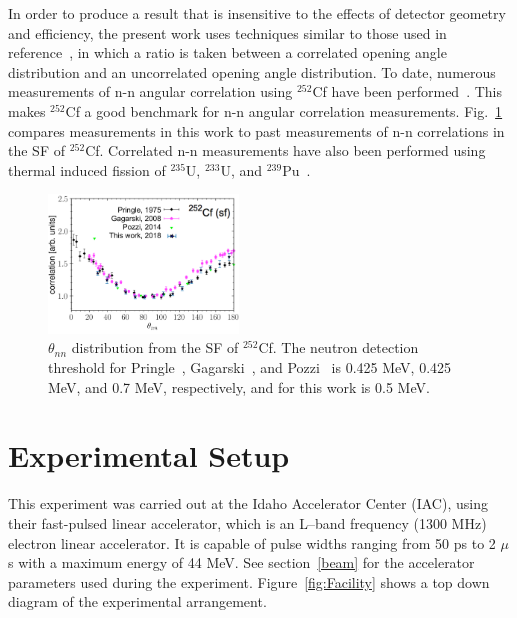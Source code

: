 \documentclass[%
 reprint,
 amsmath,amssymb,
 aps,
 nofootinbib
]{revtex4-1}
\begin{document}
In order to produce a result that is insensitive to the effects of detector geometry and efficiency, the present work uses techniques similar to those used in reference~\cite{1975Cf252}, in which a ratio is taken between a correlated opening angle distribution and an uncorrelated opening angle distribution.
To date, numerous measurements of n-n angular correlation using $^{252}$Cf have been performed~\cite{Verbeke2018, Pozzi2014, 2008CF252, 1975Cf252}.
This makes $^{252}$Cf a good benchmark for n-n angular correlation measurements.
Fig.~\ref{fig:Cf252_us_vs_them} compares measurements in this work to past measurements of n-n correlations in the SF of $^{252}$Cf.
Correlated n-n measurements have also been performed using thermal induced fission of $^{235}$U, $^{233}$U, and $^{239}$Pu~\cite{Sokolov2010}.
\begin{figure}[h]
\centering
\includegraphics[width=0.45\textwidth]{Cf252_us_vs_them.png}
\caption{$\theta_{nn}$ distribution from the SF of $^{252}$Cf.
 The neutron detection threshold for Pringle~\cite{1975Cf252}, Gagarski~\cite{2008CF252}, and Pozzi~\cite{Pozzi2016} is 0.425 MeV, 0.425 MeV, and 0.7 MeV, respectively, and for this work is 0.5 MeV.
}
\label{fig:Cf252_us_vs_them}
\end{figure}

\section{Experimental Setup}
This experiment was carried out at the Idaho Accelerator Center (IAC), using their fast-pulsed linear accelerator, which is an L--band frequency (1300 MHz) electron linear accelerator.
It is capable of pulse widths ranging from 50 ps to 2 $\mu$s with a maximum energy of 44 MeV.
See section~\ref{beam} for the accelerator parameters used during the experiment.
Figure~\ref{fig:Facility} shows a top down diagram of the experimental arrangement.
\end{document}
